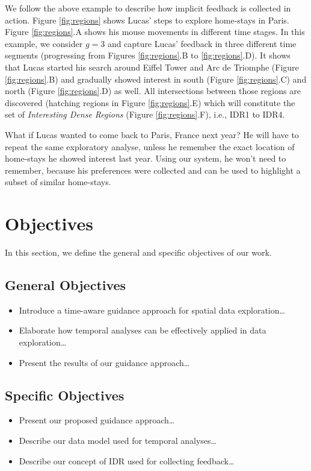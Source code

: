 We follow the above example to describe how implicit feedback is collected in action. Figure \ref{fig:regions} shows Lucas' steps to explore home-stays in Paris. Figure \ref{fig:regions}.A shows his mouse movements in different time stages. In this example, we consider $g = 3$ and capture Lucas' feedback in three different time segments (progressing from Figures \ref{fig:regions}.B to \ref{fig:regions}.D). It shows that Lucas started his search around Eiffel Tower and Arc de Triomphe (Figure \ref{fig:regions}.B) and gradually showed interest in south (Figure \ref{fig:regions}.C) and north (Figure \ref{fig:regions}.D) as well. All intersections between those regions are discovered (hatching regions in Figure \ref{fig:regions}.E) which will constitute the set of {\em Interesting Dense Regions} (Figure \ref{fig:regions}.F), i.e., IDR1 to IDR4.

What if Lucas wanted to come back to Paris, France next year? He will have to repeat the same exploratory analyse, unless he remember the exact location of home-stays he showed interest last year. Using our system, he won't need to remember, because his preferences were collected and can be used to highlight a subset of similar home-stays.

\section{Objectives}

In this section, we define the general and specific objectives of our work.

\subsection{General Objectives}

\begin{itemize}
	\item Introduce a time-aware guidance approach for spatial data exploration\ldots
	\item Elaborate how temporal analyses can be effectively applied in data exploration\ldots
	\item Present the results of our guidance approach\ldots
\end{itemize}

\subsection{Specific Objectives}

\begin{itemize}
	\item Present our proposed guidance approach\ldots
	\item Describe our data model used for temporal analyses\ldots
	\item Describe our concept of IDR used for collecting feedback\ldots
\end{itemize}

